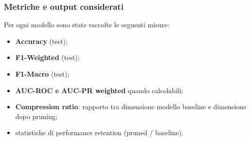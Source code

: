 \documentclass[a4paper,12pt]{report}
\begin{document}
	\subsubsection{Metriche e output considerati}
	Per ogni modello sono state raccolte le seguenti misure:
	\begin{itemize}
		\item \textbf{Accuracy} (test);
		\item \textbf{F1-Weighted} (test);
		\item \textbf{F1-Macro} (test);
		\item \textbf{AUC-ROC e AUC-PR weighted} quando calcolabili;
		\item \textbf{Compression ratio}: rapporto tra dimensione modello baseline e dimensione dopo pruning;
		\item statistiche di performance retention (pruned / baseline).
	\end{itemize}
	
\end{document}
